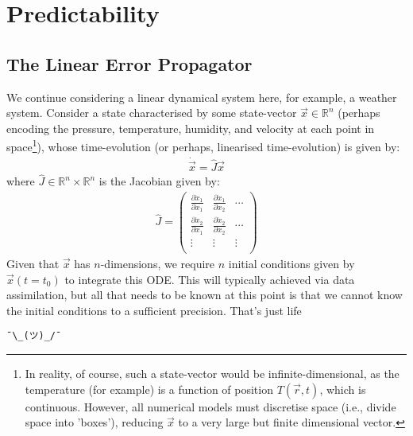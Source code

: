 \chapter{Predictability}\label{Predictability}

\section{The Linear Error Propagator}

We continue considering a linear dynamical system here, for example, a weather system. Consider a state characterised by some state-vector $\vec{x}\in\mathbb{R}^n$ (perhaps encoding the pressure, temperature, humidity, and velocity at each point in space\footnote{In reality, of course, such a state-vector would be infinite-dimensional, as the temperature (for example) is a function of position $T(\vec{r},t)$, which is continuous. However, all numerical models must discretise space (i.e., divide space into 'boxes'), reducing $\vec{x}$ to a very large but finite dimensional vector.}), whose time-evolution (or perhaps, linearised time-evolution) is given by:
\begin{align}\label{Jac}
    \dot{\vec{x}} = \hat{J}\vec{x}
\end{align}
where $\hat{J}\in\mathbb{R}^n\times\mathbb{R}^n$ is the Jacobian given by:
\begin{align}
    {\hat{J}}  =  \left( \begin{array}{ccc}
    \frac{\partial \dot{x}_1}{\partial x_1} & \frac{\partial \dot{x}_1}{\partial x_2} & \cdots \\
    \frac{\partial \dot{x}_2}{\partial x_1} & \frac{\partial \dot{x}_2}{\partial x_2} & \cdots \\
    \vdots & \vdots & \vdots \\
    \end{array} \right)
\end{align} 
Given that $\vec{x}$ has $n$-dimensions, we require $n$ initial conditions given by $\vec{x}(t=t_0)$ to integrate this ODE. This will typically achieved via data assimilation, but all that needs to be known at this point is that we cannot know the initial conditions to a sufficient precision. That's just life \begin{CJK}{UTF8}{min}\texttt{¯\textbackslash\_(ツ)\_/¯}\end{CJK}

